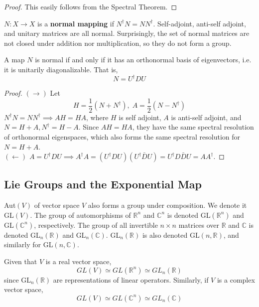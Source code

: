   \begin{proof}
  This easily follows from the Spectral Theorem. 
  \end{proof}

  \begin{definition}
  $N: X \longrightarrow X$ is a \textbf{normal mapping} if $N^\dagger N = N N^\dagger$. Self-adjoint, anti-self adjoint, and unitary matrices are all normal. Surprisingly, the set of normal matrices are not closed under addition nor multiplication, so they do not form a group. 
  \end{definition}

  \begin{theorem}
  A map $N$ is normal if and only if it has an orthonormal basis of eigenvectors, i.e. it is unitarily diagonalizable. That is, 
  \[N = U^\dagger D U \]
  \end{theorem}

  \begin{proof}
  $(\rightarrow)$ Let 
  \[H = \frac{1}{2} (N + N^\dagger), \; A = \frac{1}{2} (N - N^\dagger)\]
  $N^\dagger N = N N^\dagger \implies A H = H A$, where $H$ is self adjoint, $A$ is anti-self adjoint, and $N = H + A, N^\dagger = H - A$. Since $A H = H A$, they have the same spectral resolution of orthonormal eigenspaces, which also forms the same spectral resolution for $N = H + A$. \\
  $(\leftarrow)$ $A = U^\dagger D U \implies A^\dagger A = (U^\dagger D U) (U^\dagger \bar{D} U) = U^\dagger D \bar{D} U = A A^\dagger$. 
  \end{proof}

\subsection{Lie Groups and the Exponential Map}

  \begin{definition}
  Aut$(V)$ of vector space $V$ also forms a group under composition. We denote it GL$(V)$. The group of automorphisms of $\mathbb{R}^n$ and $\mathbb{C}^n$ is denoted GL$(\mathbb{R}^n)$ and GL$(\mathbb{C}^n)$, respectively. The group of all invertible $n \times n$ matrices over $\mathbb{R}$ and $\mathbb{C}$ is denoted GL$_n(\mathbb{R})$ and GL$_n(\mathbb{C})$. GL$_n(\mathbb{R})$ is also denoted GL$(n, \mathbb{R})$, and similarly for GL$(n, \mathbb{C})$. 
  \end{definition}

  \begin{proposition}
  Given that $V$ is a real vector space, 
  \[GL(V) \simeq GL(\mathbb{R}^n) \simeq GL_n (\mathbb{R})\]
  since GL$_n(\mathbb{R})$ are representations of linear operators. Similarly, if $V$ is a complex vector space, 
  \[GL(V) \simeq GL(\mathbb{C}^n) \simeq GL_n (\mathbb{C})\]
  \end{proposition}

